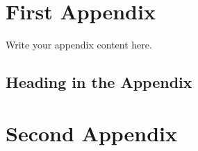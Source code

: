 \chapter{First Appendix}%
\label{chap:appenA}

Write your appendix content here.

\section{Heading in the Appendix}%
\label{sec:appenA_01}

\blindtext%

\chapter{Second Appendix}%
\label{chap:appenB}

\blindtext%
